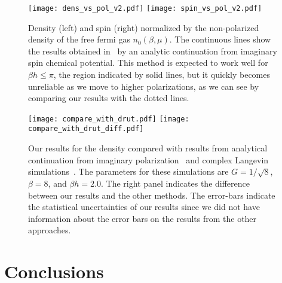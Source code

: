 \documentclass[aps,eqsecnum,amsmath,onecolumn,groupedaddress,superscriptaddress,notitlepage,nofootinbib]{revtex4-1}
\newcommand{\fig}[1]{Fig.~\ref{#1}}
\begin{document}

\begin{figure}[t]
\texttt{[image: dens\_vs\_pol\_v2.pdf]}
\texttt{[image: spin\_vs\_pol\_v2.pdf]}
\caption{Density (left) and spin (right) normalized by the non-polarized density of the free fermi gas $n_0(\beta,\mu)$. The continuous lines show the results obtained in~\cite{PhysRevA.92.063609} by an analytic continuation from imaginary spin chemical potential. This method is expected to work well for $\beta h\leq \pi$, the region indicated by solid lines, but it quickly becomes unreliable as we move to higher polarizations, as we can see by
comparing our results with the dotted lines.
}
\label{fig:all-obs}
\end{figure} 





\begin{figure}[t]
\texttt{[image: compare\_with\_drut.pdf]}
\texttt{[image: compare\_with\_drut\_diff.pdf]}
\caption{Our results for the density compared with results from analytical continuation 
from imaginary polarization~\cite{PhysRevA.92.063609} and complex Langevin 
simulations~\cite{Drut:2017fsv}. 
The parameters for these simulations are $G=1/\sqrt 8$, $\beta=8$, and $\beta h=2.0$.
The right panel indicates the
difference between our results and the other methods.
The error-bars indicate the statistical uncertainties of our results since we did not have information
about the error bars on the results from the other approaches.
}
\label{fig:compare}
\end{figure}


\section{Conclusions}\label{conclusions}
\end{document}
